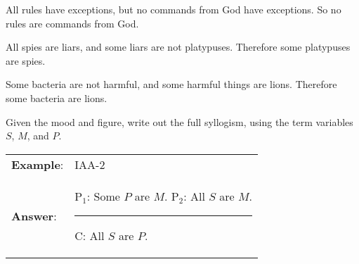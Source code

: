 \begin{exercises}
\item All rules have exceptions, but no commands from God have exceptions. So no rules are commands from God.


\item All spies are liars, and some liars are not platypuses. Therefore some platypuses are spies.


\item Some bacteria are not harmful, and some harmful things are lions. Therefore some bacteria are lions.
%

\end{exercises}

\noindent\problempart Given the mood and figure, write out the full syllogism, using the term variables $S$, $M$, and $P$.
\begin{longtabu}{p{.1\linewidth}p{.9\linewidth}}
\textbf{Example}: &IAA-2 \\
\textbf{Answer}: & P$_1$: Some $P$ are $M$. \newline
P$_2$: All $S$ are $M$.
\vskip -6pt
\rule{0.2\linewidth}{.5pt} \newline
C: All $S$ are $P$.
\end{longtabu}


